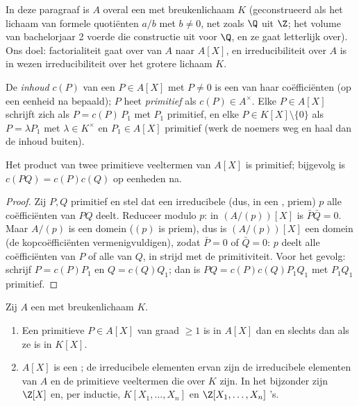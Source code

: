 In deze paragraaf is $A$ overal een  met breukenlichaam $K$
(geconstrueerd als het lichaam van formele quotiënten $a/b$ met $b
\neq 0$, net zoals $\Q$ uit $\Z$; het volume van bachelorjaar 2
voerde die constructie uit voor $\Q$, en ze gaat letterlijk over).
Ons doel: factorialiteit gaat over van $A$ naar $A[X]$, en
irreducibiliteit over $A$ is in wezen irreducibiliteit over het
grotere lichaam $K$.

\begin{definition}\label{def:b3:rings:content}
De \emph{inhoud} $c(P)$ van een
$P \in A[X]$ met $P \neq 0$ is een  van haar
coëfficiënten (op een eenheid na bepaald); $P$ heet
\emph{primitief} als $c(P) \in A^\times$. Elke $P \in A[X]$
schrijft zich als $P = c(P)\,P_1$ met $P_1$ primitief, en elke $P
\in K[X]\setminus\{0\}$ als $P = \lambda P_1$ met $\lambda \in
K^\times$ en $P_1 \in A[X]$ primitief (werk de noemers weg en haal
dan de inhoud buiten).
\end{definition}

\begin{lemma}[Gauss]\label{lem:b3:rings:gauss}
Het product van twee primitieve veeltermen van $A[X]$ is
primitief; bijgevolg is $c(PQ) = c(P)c(Q)$ op eenheden
na.
\end{lemma}

\begin{proof}
Zij $P, Q$ primitief en stel dat een irreducibele (dus, in een ,
priem) $p$ alle coëfficiënten van $PQ$ deelt. Reduceer modulo $p$:
in $(A/(p))[X]$ is $\bar P \bar Q = 0$. Maar $A/(p)$ is een domein
($(p)$ is priem), dus is $(A/(p))[X]$ een domein (de
kopcoëfficiënten vermenigvuldigen), zodat $\bar P = 0$ of $\bar Q =
0$: $p$ deelt alle coëfficiënten van $P$ of alle van $Q$, in strijd
met de primitiviteit. Voor het gevolg: schrijf $P = c(P)P_1$ en $Q
= c(Q)Q_1$; dan is $PQ = c(P)c(Q) P_1Q_1$ met $P_1Q_1$ primitief.
\end{proof}

\begin{theorem}\label{thm:b3:rings:gaussufd}
Zij $A$ een  met breukenlichaam $K$.
\begin{enumerate}
  \item Een primitieve $P \in A[X]$ van graad $\geq 1$ is
         in $A[X]$ dan en slechts dan als ze
         is in $K[X]$.
  \item $A[X]$ is een ; de irreducibele elementen ervan zijn de
        irreducibele elementen van $A$ en de primitieve veeltermen
        die over $K$  zijn. In het bijzonder zijn
        $\Z[X]$ en, per inductie, $K[X_1, \dots, X_n]$ en $\Z[X_1,
        \dots, X_n]$ 's.
\end{enumerate}
\end{theorem}

